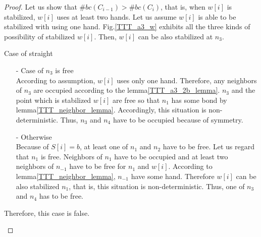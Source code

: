 \documentclass[runningheads]{llncs}
\begin{document}
\begin{proof}
Let us show that $\#bc(C_{i-1}) > \#bc(C_i)$, that is, when $w[i]$ is stabilized, $w[i]$ uses at least two hands.
Let us assume $w[i]$ is able to be stabilized with using one hand. Fig.\ref{TTT_a3_w} exhibits all the three kinds of possibility of stabilized $w[i]$. Then, $w[i]$ can be also stabilized at $n_3$. 

\begin{paragraph}{Case of straight}
\begin{itemize}
\item[-] Case of $n_3$ is free\\
According to assumption, $w[i]$ uses only one hand. Therefore, any neighbors of $n_3$ are occupied according to the lemma\ref{TTT_a3_2b_lemma}. $n_3$ and the point which is stabilized $w[i]$ are free so that $n_1$ has some bond by lemma\ref{TTT_neighbor_lemma}. Accordingly, this situation is non-deterministic. Thus, $n_3$ and $n_4$ have to be occupied because of symmetry.

\item[-] Otherwise\\
Because of  $S[i] = b$, at least one of $n_1$ and $n_2$ have to be free. Let us regard that $n_1$ is free. Neighbors of $n_1$ have to be occupied and at least two neighbors of $n_{-1}$ have to be free for $n_1$ and $w[i]$. According to lemma\ref{TTT_neighbor_lemma}, $n_{-1}$ have some hand. Therefore $w[i]$ can be also stabilized $n_1$, that is, this situation is non-deterministic. Thus, one of $n_3$ and $n_4$ has to be free.
\end{itemize}

Therefore, this case is false.
\end{paragraph}


\end{proof}
\end{document}
